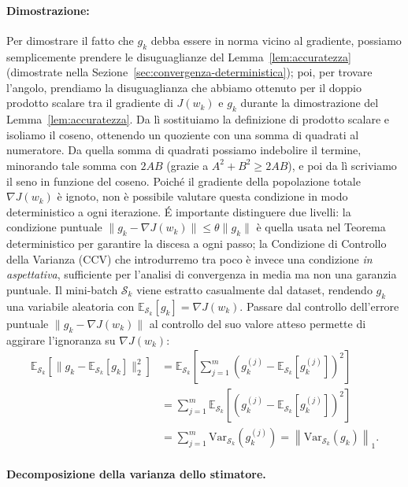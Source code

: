 \documentclass[a4paper,12pt]{article}
\numberwithin{equation}{section}
\numberwithin{figure}{section}
\numberwithin{table}{section}
\newcommand{\E}{\mathbb{E}}
\begin{document}
\paragraph{Dimostrazione:}\label{sec:cono-dimostrazione}
Per dimostrare il fatto che $g_k$ debba essere in norma vicino al gradiente, possiamo semplicemente prendere le disuguaglianze del Lemma~\ref{lem:accuratezza} (dimostrate nella Sezione~\ref{sec:convergenza-deterministica}); poi, per trovare l'angolo, prendiamo la disuguaglianza che abbiamo ottenuto per il doppio prodotto scalare tra il gradiente di $J(w_k)$ e $g_k$ durante la dimostrazione del Lemma~\ref{lem:accuratezza}. Da lì sostituiamo la definizione di prodotto scalare e isoliamo il coseno, ottenendo un quoziente con una somma di quadrati al numeratore. Da quella somma di quadrati possiamo indebolire il termine, minorando tale somma con $2AB$ (grazie a $A^2+B^2 \ge 2AB$), e poi da lì scriviamo il seno in funzione del coseno.
Poich\'e il gradiente della popolazione totale $\nabla J(w_k)$ \`e ignoto, non \`e possibile valutare questa condizione in modo deterministico a ogni iterazione. \'E importante distinguere due livelli: la condizione puntuale $\|g_k - \nabla J(w_k)\| \le \theta\|g_k\|$ \`e quella usata nel Teorema deterministico per garantire la discesa a ogni passo; la Condizione di Controllo della Varianza (CCV) che introdurremo tra poco \`e invece una condizione \emph{in aspettativa}, sufficiente per l'analisi di convergenza in media ma non una garanzia puntuale. Il mini-batch $\mathcal{S}_k$ viene estratto casualmente dal dataset, rendendo $g_k$ una variabile aleatoria con $\E_{\mathcal{S}_k}[g_k] = \nabla J(w_k)$. Passare dal controllo dell'errore puntuale $\|g_k - \nabla J(w_k)\|$ al controllo del suo valore atteso permette di aggirare l'ignoranza su $\nabla J(w_k)$:
\begin{align*}
\mathbb{E}_{\mathcal{S}_k}\left[\|g_k - \mathbb{E}_{\mathcal{S}_k}[g_k]\|_2^2\right]
&= \mathbb{E}_{\mathcal{S}_k}\left[\sum_{j=1}^{m} \left(g_k^{(j)} - \mathbb{E}_{\mathcal{S}_k}[g_k^{(j)}]\right)^2\right] \\
&= \sum_{j=1}^{m} \mathbb{E}_{\mathcal{S}_k}\left[\left(g_k^{(j)} - \mathbb{E}_{\mathcal{S}_k}[g_k^{(j)}]\right)^2\right] \\
&= \sum_{j=1}^{m} \mathrm{Var}_{\mathcal{S}_k}\left(g_k^{(j)}\right)
= \left\|\mathrm{Var}_{\mathcal{S}_k}(g_k)\right\|_1.
\end{align*}

\paragraph{Decomposizione della varianza dello stimatore.}
\end{document}
